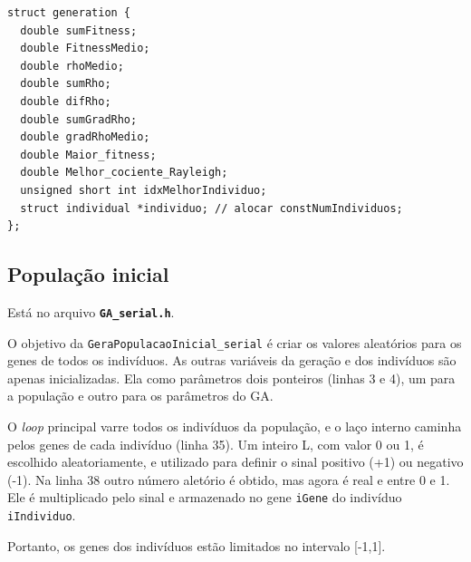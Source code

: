 \vspace{1 cm}
\begin{lstlisting}
struct generation {
  double sumFitness;
  double FitnessMedio;
  double rhoMedio;
  double sumRho;
  double difRho;
  double sumGradRho;
  double gradRhoMedio;
  double Maior_fitness;
  double Melhor_cociente_Rayleigh;
  unsigned short int idxMelhorIndividuo;
  struct individual *individuo; // alocar constNumIndividuos;
};
\end{lstlisting}
\vspace{1 cm}

\subsection{População inicial}

	Está no arquivo \textbf{\texttt{GA\_serial.h}}.
	
	O objetivo da \texttt{GeraPopulacaoInicial\_serial} é criar os valores aleatórios para os genes de todos os indivíduos. As outras variáveis da geração e dos indivíduos são apenas inicializadas. Ela como parâmetros dois ponteiros (linhas 3 e 4), um para a população e outro para os parâmetros do GA.
	
	O \emph{loop} principal varre todos os indivíduos da população, e o laço interno caminha pelos genes de cada indivíduo (linha 35). Um inteiro L, com valor 0 ou 1, é escolhido aleatoriamente, e utilizado para definir o sinal positivo (+1) ou negativo (-1). Na linha 38 outro número aletório é obtido, mas agora é real e entre 0 e 1. Ele é multiplicado pelo sinal e armazenado no gene \texttt{iGene} do indivíduo \texttt{iIndividuo}.
	
	Portanto, os genes dos indivíduos estão limitados no intervalo [-1,1].

